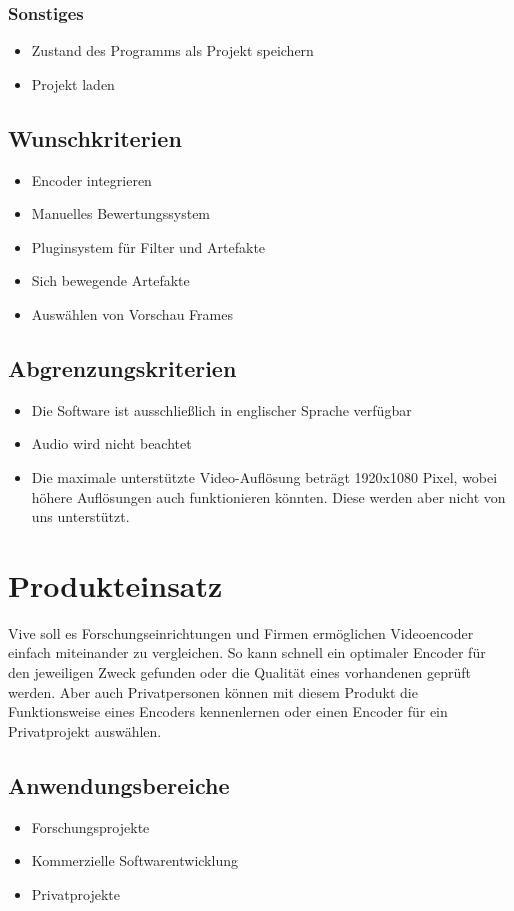 \documentclass[parskip=full]{scrartcl}
\begin{document}
\subsubsection{Sonstiges}
\begin{itemize}
\item Zustand des Programms als Projekt speichern
\item Projekt laden
\end{itemize}
\subsection{Wunschkriterien}
\begin{itemize}
\item Encoder integrieren
\item Manuelles Bewertungssystem
\item Pluginsystem für Filter und Artefakte
\item Sich bewegende Artefakte
\item Auswählen von Vorschau Frames
\end{itemize}
\subsection{Abgrenzungskriterien}
\begin{itemize}
\item Die Software ist ausschließlich in englischer Sprache verfügbar
\item Audio wird nicht beachtet
\item Die maximale unterstützte Video-Auflösung beträgt 1920x1080 Pixel, wobei höhere Auflösungen auch funktionieren könnten. Diese werden aber nicht von uns unterstützt.
\end{itemize}
\newpage
\section{Produkteinsatz}
Vive soll es Forschungseinrichtungen und Firmen ermöglichen Videoencoder einfach
miteinander zu vergleichen. So kann schnell ein optimaler Encoder für den jeweiligen Zweck
gefunden oder die Qualität eines vorhandenen geprüft werden. Aber auch Privatpersonen können
mit diesem Produkt die Funktionsweise eines Encoders kennenlernen oder einen Encoder für ein
Privatprojekt auswählen.
\subsection{Anwendungsbereiche}
\begin{itemize}
\item Forschungsprojekte
\item Kommerzielle Softwarentwicklung
\item Privatprojekte
\end{itemize}
\end{document}

